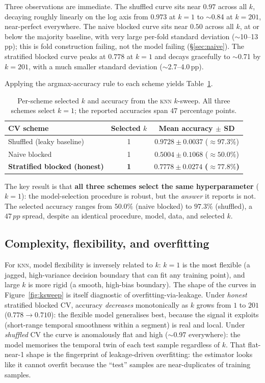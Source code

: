 \documentclass[11pt]{article}
\newcommand{\pp}{\,pp}          %
\newcommand{\knn}{\textsc{knn}}
\begin{document}
Three observations are immediate. The shuffled curve sits near $0.97$
across all $k$, decaying roughly linearly on the log axis from $0.973$ at
$k=1$ to $\sim$0.84 at $k=201$, near-perfect everywhere. The naive
blocked curve sits near $0.50$ across all $k$, at or below the majority
baseline, with very large per-fold standard deviation ($\sim$10--13\pp);
this is fold construction failing, not the model failing
(\S\ref{sec:naive}). The stratified blocked curve peaks at $0.778$ at
$k=1$ and decays gracefully to $\sim$0.71 by $k=201$, with a much smaller
standard deviation ($\sim$2.7--4.0\pp).

Applying the argmax-accuracy rule to each scheme yields Table~\ref{tab:pick}.

\begin{table}[t]
  \centering
  \caption{Per-scheme selected $k$ and accuracy from the \knn{} $k$-sweep.
  All three schemes select $k=1$; the reported accuracies span
  $47$ percentage points.}
  \label{tab:pick}
  \begin{tabular}{lcc}
    \toprule
    CV scheme & Selected $k$ & Mean accuracy $\pm$ SD \\
    \midrule
    Shuffled (leaky baseline)        & 1 & $0.9728 \pm 0.0037$ ($\approx 97.3\%$) \\
    Naive blocked                    & 1 & $0.5004 \pm 0.1068$ ($\approx 50.0\%$) \\
    \textbf{Stratified blocked (honest)} & \textbf{1} & $\mathbf{0.7778 \pm 0.0274}$ \textbf{($\approx 77.8\%$)} \\
    \bottomrule
  \end{tabular}
\end{table}

The key result is that \textbf{all three schemes select the same
hyperparameter} ($k=1$): the model-selection procedure is robust, but the
\emph{answer} it reports is not. The selected accuracy ranges from $50.0\%$
(naive blocked) to $97.3\%$ (shuffled), a $47\pp$ spread, despite an
identical procedure, model, data, and selected $k$.

\subsection{Complexity, flexibility, and overfitting}

For \knn{}, model flexibility is inversely related to $k$: $k=1$ is the most
flexible (a jagged, high-variance decision boundary that can fit any
training point), and large $k$ is more rigid (a smooth, high-bias boundary).
The shape of the curves in Figure~\ref{fig:ksweep} is itself diagnostic of
overfitting-via-leakage. Under \emph{honest} stratified blocked CV, accuracy
\emph{decreases} monotonically as $k$ grows from $1$ to $201$
($0.778 \to 0.710$): the flexible model generalises best, because the signal
it exploits (short-range temporal smoothness within a segment) is real and
local. Under \emph{shuffled} CV the curve is anomalously flat and high
($\sim$0.97 everywhere): the model memorises the temporal twin of each test
sample regardless of $k$. That flat-near-1 shape is the fingerprint of
leakage-driven overfitting: the estimator looks like it cannot overfit
because the ``test'' samples are near-duplicates of training samples.
\end{document}
